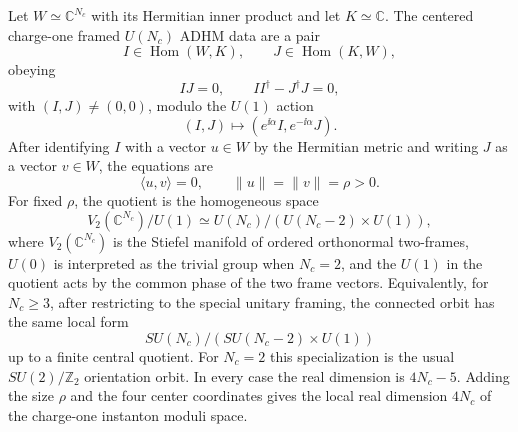\begin{proposition}
\label{prop:k-one-adhm-chart-orientation-orbit}
Let \(W\simeq\mathbb C^{N_c}\) with its Hermitian inner product and let
\(K\simeq\mathbb C\).  The centered charge-one framed \(U(N_c)\) ADHM data
are a pair
\[
  I\in\operatorname{Hom}(W,K),
  \qquad
  J\in\operatorname{Hom}(K,W),
\]
obeying
\begin{equation}
  IJ=0,
  \qquad
  II^\dagger-J^\dagger J=0,
  \label{eq:k-one-adhm-moment-equations}
\end{equation}
with \((I,J)\ne(0,0)\), modulo the \(U(1)\) action
\[
  (I,J)\longmapsto(e^{\ii\alpha}I,e^{-\ii\alpha}J).
\]
After identifying \(I\) with a vector \(u\in W\) by the Hermitian metric and
writing \(J\) as a vector \(v\in W\), the equations are
\begin{equation}
  \langle u,v\rangle=0,
  \qquad
  \|u\|=\|v\|=\rho>0 .
  \label{eq:k-one-adhm-orthonormal-pair}
\end{equation}
For fixed \(\rho\), the quotient is the homogeneous space
\begin{equation}
  V_2(\mathbb C^{N_c})/U(1)
  \simeq
  U(N_c)/(U(N_c-2)\times U(1)),
  \label{eq:k-one-adhm-orientation-orbit}
\end{equation}
where \(V_2(\mathbb C^{N_c})\) is the Stiefel manifold of ordered
orthonormal two-frames, \(U(0)\) is interpreted as the trivial group when
\(N_c=2\), and the \(U(1)\) in the quotient acts by the common phase of the
two frame vectors.  Equivalently, for \(N_c\ge3\), after
restricting to the special unitary framing, the connected orbit has the same
local form
\[
  SU(N_c)/(SU(N_c-2)\times U(1))
\]
up to a finite central quotient.  For \(N_c=2\) this specialization is the
usual \(SU(2)/\mathbb Z_2\) orientation orbit.  In every case the real
dimension is \(4N_c-5\).  Adding the size \(\rho\) and the four center
coordinates gives the local real dimension \(4N_c\) of the charge-one
instanton moduli space.
\end{proposition}

